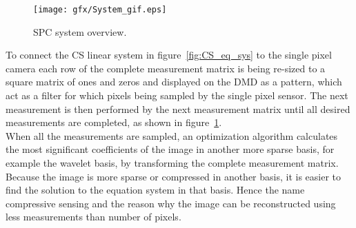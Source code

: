 \begin{figure}[H]
\texttt{[image: gfx/System\_gif.eps]}
	\caption{SPC system overview.}
	\label{fig:system_overview}
\end{figure}	

To connect the CS linear system in figure~\ref{fig:CS_eq_sys} to the single pixel camera each row of the complete measurement matrix is being re-sized to a square matrix of ones and zeros and displayed on the DMD as a pattern, which act as a filter for which pixels being sampled by the single pixel sensor. The next measurement is then performed by the next measurement matrix until all desired measurements are completed, as shown in figure~\ref{fig:system_overview}.\\[0.1in]

When all the measurements are sampled, an optimization algorithm calculates the most significant coefficients of the image in another more sparse basis, for example the wavelet basis, by transforming the complete measurement matrix. Because the image is more sparse or compressed in another basis, it is easier to find the solution to the equation system in that basis. Hence the name compressive sensing and the reason why the image can be reconstructed using less measurements than number of pixels.    









